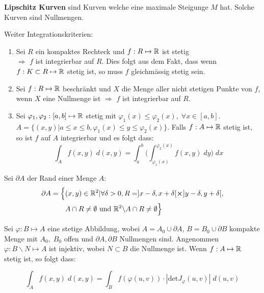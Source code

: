 \textbf{Lipschitz Kurven} sind Kurven welche eine maximale Steigunge $M$ hat. Solche Kurven sind Nullmengen. \medskip

Weiter Integrationskriterien:
\begin{enumerate}[label=(\arabic*)]
    \item Sei $R$ ein kompaktes Rechteck und $f: R \mapsto \mathbb{R}$ ist stetig \\
    $\Rightarrow$ $f$ ist integrierbar auf $R$. Dies folgt aus dem Fakt, dass wenn $f: K \subset R \mapsto \mathbb{R}$ stetig ist, 
    so muss $f$ gleichmässig stetig sein.
    
    \item Sei $f: R \mapsto \mathbb{R}$ beschränkt und $X$ die Menge aller nicht stetigen Punkte von $f$, wenn $X$ eine Nullmenge ist
    $\Rightarrow$ $f$ ist integrierbar auf $R$.
    
    \item Sei $\varphi_1, \varphi_2 : [a,b] \mapsto \mathbb{R}$ stetig mit $\varphi_1(x) \leq \varphi_2(x), \; \forall x \in [a,b]$.
    $A = \{(x,y) | a \leq x \leq b, \varphi_1(x) \leq y \leq \varphi_2(x)\}$. Falls $f: A \mapsto \mathbb{R}$ stetig ist, so ist $f$ 
    auf $A$ integrierbar und es folgt dass:
    $$\int_A f(x,y) \; d(x,y) = \int_a^b \Big( \int_{\varphi_1(x)}^{\varphi_2(x)} f(x,y) \; dy \Big) \; dx$$
\end{enumerate}



Sei $\partial A$ der Rand einer Menge $A$:
\begin{align*}
    \partial A = \Big\{ &(x,y) \in \mathbb{R}^2 | \forall \delta > 0, R = ]x - \delta, x + \delta[ \cross ] y -\delta, y + \delta[, \\
    &A \cap R \neq \emptyset \text{ und } \mathbb{R}^2 \backslash A \cap R \neq \emptyset \Big\}
\end{align*}

Sei $\varphi: B \mapsto A$ eine stetige Abbildung, wobei $A = A_0 \cup \partial A$,  
$B = B_0 \cup \partial B$ kompakte Menge mit $A_0,\; B_0$ offen und $\partial A, \partial B$ 
Nullmengen sind. Angenommen $\varphi: B \backslash N \mapsto A$ ist injektiv, wobei $N \subset B$ 
die Nullmenge ist. Wenn $f: A \mapsto \mathbb{R}$ stetig ist, so folgt dass:

$$\int_A f(x,y) \; d(x,y) = \int_B f(\varphi(u,v)) \cdot |\text{det} J_\varphi(u,v) | \; d(u,v)$$


\vfill\null
\columnbreak


